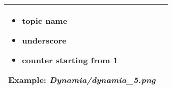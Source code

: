\begin{longtable}[H]{|p{8cm}|p{8cm}|}

\begin{itemize}
\item topic name
\item underscore
\item counter starting from 1
\end{itemize}

Example: \textit{Dynamia/dynamia\_5.png} \\\hline


\end{longtable}
